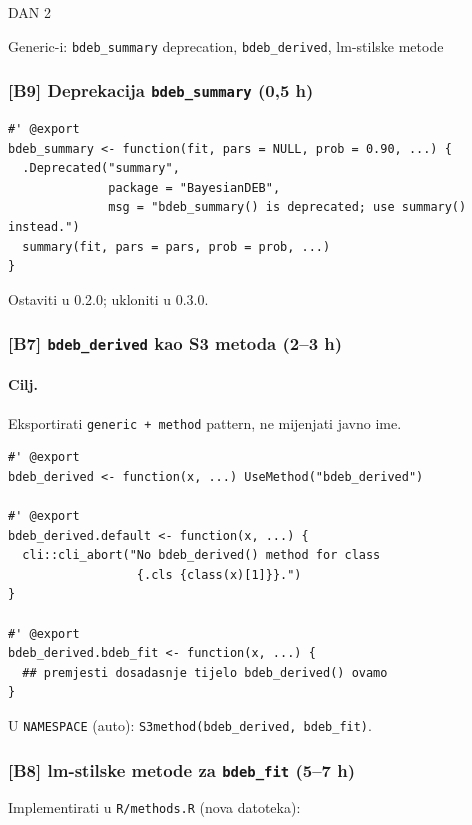 \documentclass[11pt,a4paper]{article}
\newcommand{\dayhead}[2]{%
  \vspace{0.6em}\par\noindent%
  \colorbox{daygray}{\color{white}\bfseries\strut\;DAN #1\;}\;%
  \colorbox{daylight}{\color{daygray}\strut\;#2\;}\par\vspace{0.4em}%
}
\newcommand{\file}[1]{\texttt{\small #1}}
\newcommand{\code}[1]{\texttt{\small #1}}
\begin{document}
\dayhead{2}{Generic-i: \texttt{bdeb\_summary} deprecation,
\texttt{bdeb\_derived}, lm-stilske metode}

\subsubsection*{[B9] Deprekacija \texttt{bdeb\_summary} (0{,}5 h)}

\begin{lstlisting}
#' @export
bdeb_summary <- function(fit, pars = NULL, prob = 0.90, ...) {
  .Deprecated("summary",
              package = "BayesianDEB",
              msg = "bdeb_summary() is deprecated; use summary() instead.")
  summary(fit, pars = pars, prob = prob, ...)
}
\end{lstlisting}

\noindent Ostaviti u 0.2.0; ukloniti u 0.3.0.

\subsubsection*{[B7] \texttt{bdeb\_derived} kao S3 metoda (2--3 h)}

\paragraph{Cilj.} Eksportirati \code{generic + method} pattern, ne
mijenjati javno ime.

\begin{lstlisting}
#' @export
bdeb_derived <- function(x, ...) UseMethod("bdeb_derived")

#' @export
bdeb_derived.default <- function(x, ...) {
  cli::cli_abort("No bdeb_derived() method for class
                  {.cls {class(x)[1]}}.")
}

#' @export
bdeb_derived.bdeb_fit <- function(x, ...) {
  ## premjesti dosadasnje tijelo bdeb_derived() ovamo
}
\end{lstlisting}

\noindent U \file{NAMESPACE} (auto):
\code{S3method(bdeb\_derived, bdeb\_fit)}.

\subsubsection*{[B8] lm-stilske metode za \texttt{bdeb\_fit} (5--7 h)}

Implementirati u \file{R/methods.R} (nova datoteka):
\end{document}
